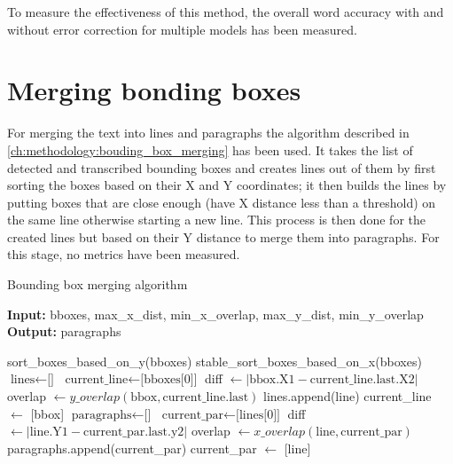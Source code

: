 To measure the effectiveness of this method, the overall word accuracy with and without error correction for multiple models has been measured.

\section{Merging bonding boxes}

For merging the text into lines and paragraphs the algorithm described in \ref{ch:methodology:bouding_box_merging} has been used. It takes the list of detected and transcribed bounding boxes and creates lines out of them by first sorting the boxes based on their X and Y coordinates; it then builds the lines by putting boxes that are close enough (have X distance less than a threshold) on the same line otherwise starting a new line. This process is then done for the created lines but based on their Y distance to merge them into paragraphs. For this stage, no metrics have been measured.

\begin{algorithm}
\caption{Bounding box merging algorithm}\label{ch:methodology:bouding_box_merging}
\textbf{Input:} bboxes, max\_x\_dist, min\_x\_overlap, max\_y\_dist, min\_y\_overlap \\
\textbf{Output:} paragraphs 
\begin{algorithmic}
\State sort\_boxes\_based\_on\_y(bboxes)\;
\State stable\_sort\_boxes\_based\_on\_x(bboxes)\;
\State $\text{lines} \gets \text{[]}$
\State $\text{current\_line} \gets \text{[bboxes[0]]}$
\State diff $\gets | \text{bbox.X1} - \text{current\_line.last.X2}|$
\State overlap $\gets y\_overlap(\text{bbox} , \text{current\_line.last})$
    \State lines.append(line)
    \State current\_line $\gets$ [bbox]
\EndIf
\EndFor
\State $\text{paragraphs} \gets \text{[]}$
\State $\text{current\_par} \gets \text{[lines[0]]}$
\State diff $\gets | \text{line.Y1} - \text{current\_par.last.y2}|$
\State overlap $\gets x\_overlap(\text{line} , \text{current\_par})$
    \State paragraphs.append(current\_par)
    \State current\_par $\gets$ [line]
\EndIf
\EndFor
\end{algorithmic}
\end{algorithm}